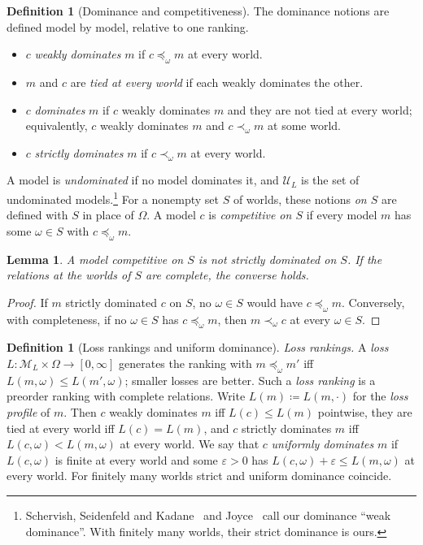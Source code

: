 \documentclass[11pt]{article}
\newtheorem{lemma}[theorem]{Lemma}
\theoremstyle{definition}
\newtheorem{definition}[theorem]{Definition}
\theoremstyle{remark}
\newcommand{\M}{\mathcal M}
\newcommand{\U}{\mathcal U}
\begin{document}
\begin{definition}[Dominance and competitiveness]\label{def:dominance}
The dominance notions are defined model by model, relative to one ranking.
\begin{itemize}[leftmargin=*]
\item $c$ \emph{weakly dominates} $m$ if $c\preceq_\omega m$ at every world.
\item $m$ and $c$ are \emph{tied at every world} if each weakly dominates the other.
\item $c$ \emph{dominates} $m$ if $c$ weakly dominates $m$ and they are not tied at every world; equivalently, $c$ weakly dominates $m$ and $c\prec_\omega m$ at some world.
\item $c$ \emph{strictly dominates} $m$ if $c\prec_\omega m$ at every world.
\end{itemize}
A model is \emph{undominated} if no model dominates it, and $\U_L$ is the set of undominated models.\footnote{Schervish, Seidenfeld and Kadane~\cite{SSK09} and Joyce~\cite{Joyce} call our dominance ``weak dominance''. With finitely many worlds, their strict dominance is ours.} For a nonempty set $S$ of worlds, these notions \emph{on $S$} are defined with $S$ in place of $\Omega$. A model $c$ is \emph{competitive on $S$} if every model $m$ has some $\omega\in S$ with $c\preceq_\omega m$.
\end{definition}

\begin{lemma}\label{lem:competitive}
A model competitive on $S$ is not strictly dominated on $S$. If the relations at the worlds of $S$ are complete, the converse holds.
\end{lemma}
\begin{proof}
If $m$ strictly dominated $c$ on $S$, no $\omega\in S$ would have $c\preceq_\omega m$. Conversely, with completeness, if no $\omega\in S$ has $c\preceq_\omega m$, then $m\prec_\omega c$ at every $\omega\in S$.
\end{proof}

\begin{definition}[Loss rankings and uniform dominance]\label{def:loss}
\emph{Loss rankings.} A \emph{loss} $L:\M_L\times\Omega\to[0,\infty]$ generates the ranking with $m\preceq_\omega m'$ iff $L(m,\omega)\le L(m',\omega)$; smaller losses are better. Such a \emph{loss ranking} is a preorder ranking with complete relations. Write $L(m)\coloneqq L(m,\cdot)$ for the \emph{loss profile} of $m$. Then $c$ weakly dominates $m$ iff $L(c)\le L(m)$ pointwise, they are tied at every world iff $L(c)=L(m)$, and $c$ strictly dominates $m$ iff $L(c,\omega)<L(m,\omega)$ at every world. We say that $c$ \emph{uniformly dominates} $m$ if $L(c,\omega)$ is finite at every world and some $\varepsilon>0$ has $L(c,\omega)+\varepsilon\le L(m,\omega)$ at every world. For finitely many worlds strict and uniform dominance coincide.
\end{definition}
\end{document}
